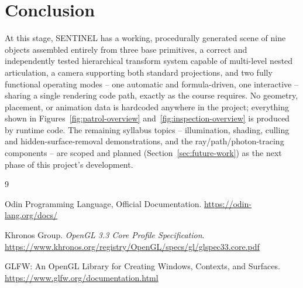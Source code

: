 \documentclass[11pt,a4paper]{article}
\begin{document}
\section{Conclusion}

At this stage, SENTINEL has a working, procedurally generated scene of
nine objects assembled entirely from three base primitives, a correct
and independently tested hierarchical transform system capable of
multi-level nested articulation, a camera supporting both standard
projections, and two fully functional operating modes -- one automatic
and formula-driven, one interactive -- sharing a single rendering code
path, exactly as the course requires. No geometry, placement, or
animation data is hardcoded anywhere in the project; everything shown in
Figures~\ref{fig:patrol-overview} and~\ref{fig:inspection-overview} is
produced by runtime code. The remaining syllabus topics --
illumination, shading, culling and hidden-surface-removal
demonstrations, and the ray/path/photon-tracing components -- are
scoped and planned (Section~\ref{sec:future-work}) as the next phase of
this project's development.

\vspace{2em}
\begin{thebibliography}{9}

Odin Programming Language, Official Documentation.
\url{https://odin-lang.org/docs/}

Khronos Group. \textit{OpenGL 3.3 Core Profile Specification}.
\url{https://www.khronos.org/registry/OpenGL/specs/gl/glspec33.core.pdf}

GLFW: An OpenGL Library for Creating Windows, Contexts, and Surfaces.
\url{https://www.glfw.org/documentation.html}

\end{thebibliography}
\end{document}
